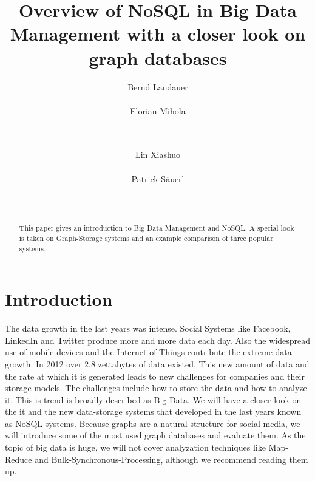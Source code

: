\documentclass{acm_proc_article-sp}
\begin{document}
\title{Overview of NoSQL in Big Data Management with a closer look on graph databases }

\author{
\alignauthor
Bernd Landauer\\
       \\
\alignauthor 
Florian Mihola\\
	\\
	\\
\and
\alignauthor Lin Xiashuo \\
       \\
\alignauthor Patrick S{\"a}uerl\\
       \\
       \\
}


\maketitle
\begin{abstract}
This paper gives an introduction to Big Data Management and NoSQL. A special look is taken on Graph-Storage systems and an example comparison of three popular systems.
\end{abstract}

\section{Introduction}

The data growth in the last years was intense. Social Systems like Facebook, LinkedIn and Twitter produce more and more data each day. Also the widespread use of mobile devices and the Internet of Things contribute the extreme data growth. In 2012 over 2.8 zettabytes of data existed\cite{DBLP:conf/bis/SchmidtMMPH14}. This new amount of data and the rate at which it is generated leads to new challenges for companies and their storage models. The challenges include how to store the data and how to analyze it. This is trend is broadly described as Big Data. We will have a closer look on the it and the new data-storage systems that developed in the last years known as NoSQL systems. Because graphs are a natural structure for social media, we will introduce some of the most used graph databases and evaluate them. As the topic of big data is huge, we will not cover analyzation techniques like Map-Reduce and Bulk-Synchronous-Processing, although we recommend reading them up.
\end{document}
